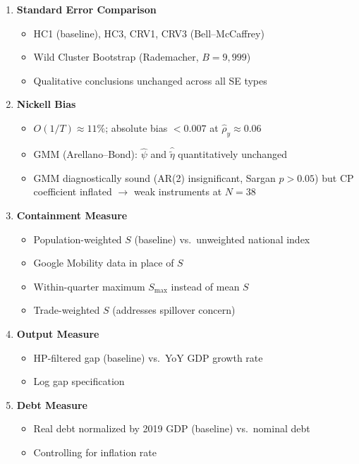 \documentclass[12pt, a4paper]{article}
\begin{document}
\begin{enumerate}[resume]

\item \textbf{Standard Error Comparison}
\begin{itemize}
    \item HC1 (baseline), HC3, CRV1, CRV3 (Bell--McCaffrey)
    \item Wild Cluster Bootstrap (Rademacher, $B = 9{,}999$)
    \item Qualitative conclusions unchanged across all SE types
\end{itemize}

\item \textbf{Nickell Bias}
\begin{itemize}
    \item $O(1/T) \approx 11\%$; absolute bias $< 0.007$ at
        $\hat{\rho}_y \approx 0.06$
    \item GMM (Arellano--Bond): $\hat{\psi}$ and $\hat{\tilde{\eta}}$
        quantitatively unchanged
    \item GMM diagnostically sound (AR(2) insignificant, Sargan $p > 0.05$)
        but CP coefficient inflated $\to$ weak instruments at $N = 38$
\end{itemize}

\item \textbf{Containment Measure}
\begin{itemize}
    \item Population-weighted $S$ (baseline) vs.\ unweighted national index
    \item Google Mobility data in place of $S$
    \item Within-quarter maximum $S_{\max}$ instead of mean $S$
    \item Trade-weighted $S$ (addresses spillover concern)
\end{itemize}

\item \textbf{Output Measure}
\begin{itemize}
    \item HP-filtered gap (baseline) vs.\ YoY GDP growth rate
    \item Log gap specification
\end{itemize}

\item \textbf{Debt Measure}
\begin{itemize}
    \item Real debt normalized by 2019 GDP (baseline) vs.\ nominal debt
    \item Controlling for inflation rate
\end{itemize}


\end{enumerate}
\end{document}
